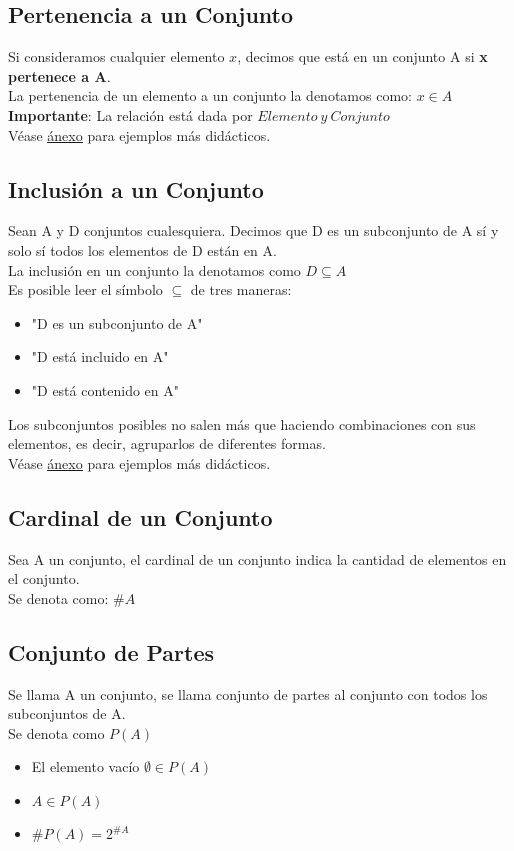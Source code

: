 \documentclass[10pt,a4paper]{article}
\begin{document}
\subsection*{Pertenencia a un Conjunto}
Si consideramos cualquier elemento $x$, decimos que está en un conjunto A si \textbf{x pertenece a A}. \\
La pertenencia de un elemento a un conjunto la denotamos como: $x \in A$ \\
\textbf{Importante}: La relación está dada por $Elemento \ y \ Conjunto$ \\
Véase \hyperref[subsec:pertenencia_conjuntos]{\underline{ánexo}} para ejemplos más didácticos.
\subsection*{Inclusión a un Conjunto}
Sean A y D conjuntos cualesquiera.
Decimos que D es un subconjunto de A sí y solo sí todos los elementos de D están en A. \\
La inclusión en un conjunto la denotamos como $D \subseteq A$ \\
Es posible leer el símbolo $ \subseteq $ de tres maneras: 
\begin{itemize}
    \item "D es un subconjunto de A"
    \item "D está incluido en A"
    \item "D está contenido en A"
\end{itemize}
Los subconjuntos posibles no salen más que haciendo combinaciones con sus elementos, es decir, agruparlos de diferentes formas. \\
Véase \hyperref[subsec:inclusion_conjuntos]{\underline{ánexo}} para ejemplos más didácticos.
\subsection*{Cardinal de un Conjunto}
Sea A un conjunto, el cardinal de un conjunto indica la cantidad de elementos en el conjunto. \\
Se denota como: $\#A$
\subsection*{Conjunto de Partes}
Se llama A un conjunto, se llama conjunto de partes al conjunto con todos los subconjuntos de A. \\
Se denota como $P(A)$
\begin{itemize}
    \item El elemento vacío $\emptyset \in P(A)$
    \item $A \in P(A)$
    \item $\#P(A) = 2^{\#A}$
\end{itemize}
\end{document}
